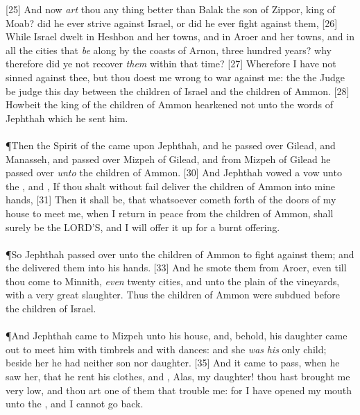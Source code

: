 [25] \textcolor[cmyk]{0.99998,1,0,0}{And now \emph{art} thou any thing better than Balak the son of Zippor, king of Moab? did he ever strive against Israel, or did he ever fight against them,}
[26] \textcolor[cmyk]{0.99998,1,0,0}{While Israel dwelt in Heshbon and her towns, and in Aroer and her towns, and in all the cities that \emph{be} along by the coasts of Arnon, three hundred years? why therefore did ye not recover \emph{them} within that time?}
[27] \textcolor[cmyk]{0.99998,1,0,0}{Wherefore I have not sinned against thee, but thou doest me wrong to war against me: the  the Judge be judge this day between the children of Israel and the children of Ammon.}
[28] \textcolor[cmyk]{0.99998,1,0,0}{Howbeit the king of the children of Ammon hearkened not unto the words of Jephthah which he sent him.}\\
\\
\P \textcolor[cmyk]{0.99998,1,0,0}{Then the Spirit of the  came upon Jephthah, and he passed over Gilead, and Manasseh, and passed over Mizpeh of Gilead, and from Mizpeh of Gilead he passed over \emph{unto} the children of Ammon.}
[30] \textcolor[cmyk]{0.99998,1,0,0}{And Jephthah vowed a vow unto the , and , If thou shalt without fail deliver the children of Ammon into mine hands,}
[31] \textcolor[cmyk]{0.99998,1,0,0}{Then it shall be, that whatsoever cometh forth of the doors of my house to meet me, when I return in peace from the children of Ammon, shall surely be the LORD'S, and I will offer it up for a burnt offering.}\\
\\
\P \textcolor[cmyk]{0.99998,1,0,0}{So Jephthah passed over unto the children of Ammon to fight against them; and the  delivered them into his hands.}
[33] \textcolor[cmyk]{0.99998,1,0,0}{And he smote them from Aroer, even till thou come to Minnith, \emph{even} twenty cities, and unto the plain of the vineyards, with a very great slaughter. Thus the children of Ammon were subdued before the children of Israel.}\\
\\
\P \textcolor[cmyk]{0.99998,1,0,0}{And Jephthah came to Mizpeh unto his house, and, behold, his daughter came out to meet him with timbrels and with dances: and she \emph{was} \emph{his} only child; beside her he had neither son nor daughter.}
[35] \textcolor[cmyk]{0.99998,1,0,0}{And it came to pass, when he saw her, that he rent his clothes, and , Alas, my daughter! thou hast brought me very low, and thou art one of them that trouble me: for I have opened my mouth unto the , and I cannot go back.}
